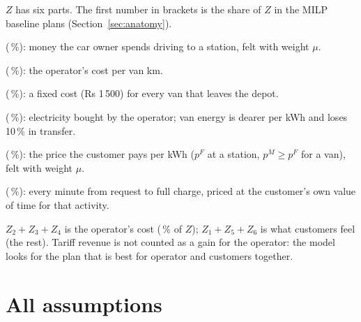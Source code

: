 $Z$ has six parts. The first number in brackets is the share of $Z$ in the MILP baseline plans (Section~\ref{sec:anatomy}).
\begin{description}[leftmargin=1.5em]
  \item[$Z_1$ EV driving] (\fshareZOne\,\%): money the car owner spends driving to a station, felt with weight $\mu$.
  \item[$Z_2$ van driving] (\fshareZTwo\,\%): the operator's cost per van km.
  \item[$Z_3$ van dispatch] (\fshareZThree\,\%): a fixed cost (Rs 1\,500) for every van that leaves the depot.
  \item[$Z_4$ operator energy] (\fshareZFour\,\%): electricity bought by the operator; van energy is dearer per kWh and loses 10\,\% in transfer.
  \item[$Z_5$ tariff] (\fshareZFive\,\%): the price the customer pays per kWh ($p^F$ at a station, $p^M\ge p^F$ for a van), felt with weight $\mu$.
  \item[$Z_6$ time] (\fshareZSix\,\%): every minute from request to full charge, priced at the customer's own value of time for that activity.
\end{description}
$Z_2+Z_3+Z_4$ is the operator's cost (\fshareOperator\,\% of $Z$); $Z_1+Z_5+Z_6$ is what customers feel (the rest). Tariff revenue is not counted as a gain for the operator: the model looks for the plan that is best for operator and customers together.


\section{All assumptions}


